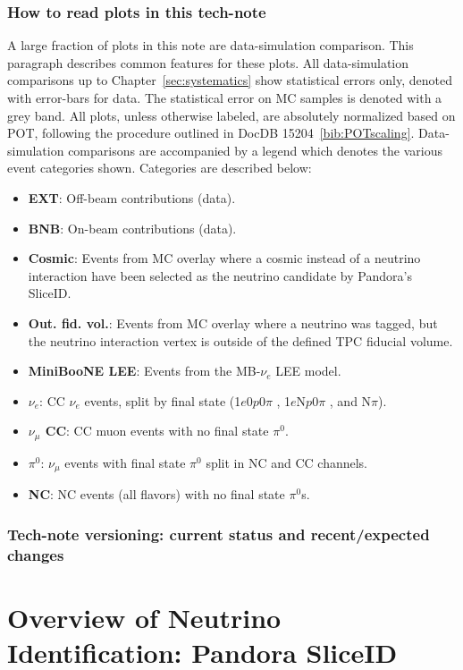 \documentclass[a4paper]{article}
\newcommand{\npsel}{1$e$N$p$0$\pi$ }
\newcommand{\zpsel}{1$e$0$p$0$\pi$ }
\begin{document}
\subsubsection{How to read plots in this tech-note} A large fraction of plots in this note are data-simulation comparison. This paragraph describes common features for these plots. All data-simulation comparisons up to Chapter~\ref{sec:systematics} show statistical errors only, denoted with error-bars for data. The statistical error on MC samples is denoted with a grey band. All plots, unless otherwise labeled, are absolutely normalized based on POT, following the procedure outlined in DocDB 15204~\ref{bib:POTscaling}. Data-simulation comparisons are accompanied by a legend which denotes the various event categories shown. Categories are described below:
\begin{itemize}
    \item \textbf{EXT}: Off-beam contributions (data).
    \item \textbf{BNB}: On-beam contributions (data).
    \item \textbf{Cosmic}: Events from MC overlay where a cosmic instead of a neutrino interaction have been selected as the neutrino candidate by Pandora's SliceID.
    \item \textbf{Out. fid. vol.}: Events from MC overlay where a neutrino was tagged, but the neutrino interaction vertex is outside of the defined TPC fiducial volume.
    \item \textbf{MiniBooNE LEE}: Events from the MB-$\nu_e$ LEE model.
    \item \textbf{$\nu_e$}: CC $\nu_e$ events, split by final state (\zpsel, \npsel, and N$\pi$).
    \item \textbf{$\nu_{\mu}$ CC}: CC muon events with no final state $\pi^0$.
    \item \textbf{$\pi^0$}: $\nu_{\mu}$ events with final state $\pi^0$ split in NC and CC channels.
    \item \textbf{NC}: NC events (all flavors) with no final state $\pi^0$s.
\end{itemize}{}

\subsubsection{Tech-note versioning: current status and recent/expected changes }


\newpage

\section{Overview of Neutrino Identification: Pandora SliceID}
\label{sec:sliceID}

\end{document}
